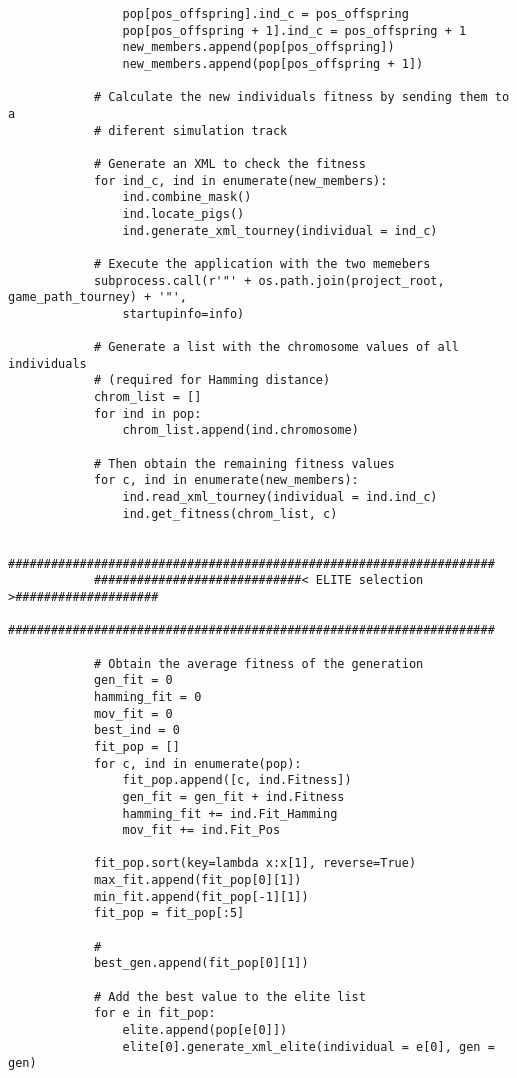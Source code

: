 \begin{verbatim}
                pop[pos_offspring].ind_c = pos_offspring
                pop[pos_offspring + 1].ind_c = pos_offspring + 1
                new_members.append(pop[pos_offspring])
                new_members.append(pop[pos_offspring + 1])
            
            # Calculate the new individuals fitness by sending them to a 
            # diferent simulation track
            
            # Generate an XML to check the fitness
            for ind_c, ind in enumerate(new_members):
                ind.combine_mask()
                ind.locate_pigs()
                ind.generate_xml_tourney(individual = ind_c)
            
            # Execute the application with the two memebers
            subprocess.call(r'"' + os.path.join(project_root, game_path_tourney) + '"', 
                startupinfo=info)

            # Generate a list with the chromosome values of all individuals 
            # (required for Hamming distance)
            chrom_list = []
            for ind in pop:
                chrom_list.append(ind.chromosome)

            # Then obtain the remaining fitness values
            for c, ind in enumerate(new_members):
                ind.read_xml_tourney(individual = ind.ind_c)
                ind.get_fitness(chrom_list, c)

            ####################################################################
            #############################< ELITE selection >####################
            ####################################################################

            # Obtain the average fitness of the generation
            gen_fit = 0
            hamming_fit = 0
            mov_fit = 0
            best_ind = 0
            fit_pop = []
            for c, ind in enumerate(pop):
                fit_pop.append([c, ind.Fitness])
                gen_fit = gen_fit + ind.Fitness
                hamming_fit += ind.Fit_Hamming
                mov_fit += ind.Fit_Pos
            
            fit_pop.sort(key=lambda x:x[1], reverse=True)
            max_fit.append(fit_pop[0][1])
            min_fit.append(fit_pop[-1][1])
            fit_pop = fit_pop[:5]
            
            # 
            best_gen.append(fit_pop[0][1])

            # Add the best value to the elite list
            for e in fit_pop:
                elite.append(pop[e[0]])
                elite[0].generate_xml_elite(individual = e[0], gen = gen)


\end{verbatim}
